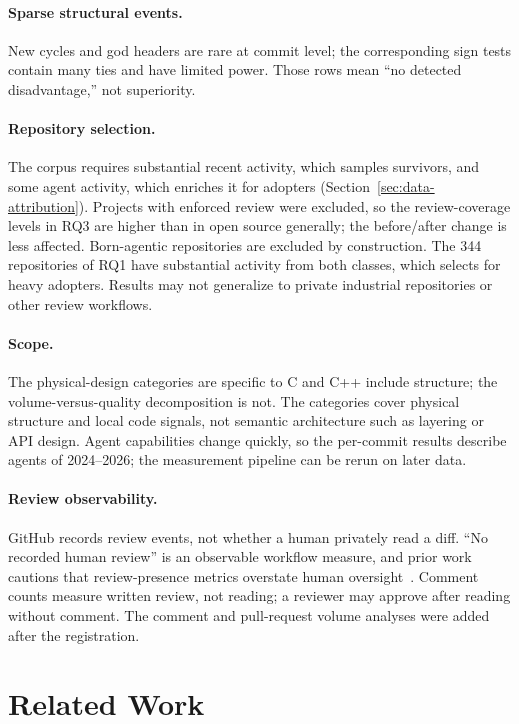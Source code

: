 \documentclass[sigplan,11pt,nonacm=true]{acmart}
\begin{document}
\paragraph{Sparse structural events.} New cycles and god headers are rare at
commit level; the corresponding sign tests contain many ties and have limited
power. Those rows mean ``no detected disadvantage,'' not superiority.

\paragraph{Repository selection.} The corpus requires substantial recent
activity, which samples survivors, and some agent activity, which enriches it
for adopters (Section~\ref{sec:data-attribution}). Projects with enforced
review were excluded, so the review-coverage levels in RQ3 are higher than
in open source generally; the before/after change is less affected.
Born-agentic repositories are excluded by construction. The 344 repositories
of RQ1 have substantial activity from both classes, which selects for heavy
adopters. Results may not generalize to private industrial repositories or
other review workflows.

\paragraph{Scope.} The physical-design categories are specific to C and C++
include structure; the volume-versus-quality decomposition is not. The
categories cover physical structure and local code signals, not semantic
architecture such as layering or API design. Agent capabilities change
quickly, so the per-commit results describe agents of 2024--2026; the
measurement pipeline can be rerun on later data.

\paragraph{Review observability.} GitHub records review events, not whether a
human privately read a diff. ``No recorded human review'' is an observable
workflow measure, and prior work cautions that review-presence metrics
overstate human oversight~\cite{duma2026reviews}. Comment counts measure
written review, not reading; a reviewer may approve after reading without
comment. The comment and pull-request volume analyses were added after the
registration.

\section{Related Work}
\label{sec:related}
\end{document}

